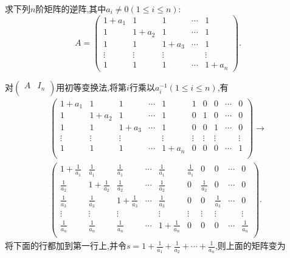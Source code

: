 \documentclass[../../main.tex]{subfiles}%
\begin{document}
\begin{example}\label{example2.3}
求下列\(n\)阶矩阵的逆阵,其中\(a_i \neq 0(1\leqslant  i\leqslant  n)\):
\[
A = 
\begin{pmatrix}
1 + a_1 & 1 & 1 & \cdots & 1 \\
1 & 1 + a_2 & 1 & \cdots & 1 \\
1 & 1 & 1 + a_3 & \cdots & 1 \\
\vdots & \vdots & \vdots & & \vdots \\
1 & 1 & 1 & \cdots & 1 + a_n
\end{pmatrix}.
\]
\end{example}
\begin{solution}
对\(\left( \begin{matrix}
A&		I_n\\
\end{matrix} \right) \)用初等变换法,将第\(i\)行乘以\(a_i^{-1}(1\leqslant  i\leqslant  n)\),有
\begin{gather*}
\left( \begin{matrix}
1+a_1&		1&		1&		\cdots&		1&		1&		0&		0&		\cdots&		0\\
1&		1+a_2&		1&		\cdots&		1&		0&		1&		0&		\cdots&		0\\
1&		1&		1+a_3&		\cdots&		1&		0&		0&		1&		\cdots&		0\\
\vdots&		\vdots&		\vdots&		&		\vdots&		\vdots&		\vdots&		\vdots&		&		\vdots\\
1&		1&		1&		\cdots&		1+a_n&		0&		0&		0&		\cdots&		1\\
\end{matrix} \right) \rightarrow 
\\
\left( \begin{matrix}
1+\frac{1}{a_1}&		\frac{1}{a_1}&		\frac{1}{a_1}&		\cdots&		\frac{1}{a_1}&		\frac{1}{a_1}&		0&		0&		\cdots&		0\\
\frac{1}{a_2}&		1+\frac{1}{a_2}&		\frac{1}{a_2}&		\cdots&		\frac{1}{a_2}&		0&		\frac{1}{a_2}&		0&		\cdots&		0\\
\frac{1}{a_3}&		\frac{1}{a_3}&		1+\frac{1}{a_3}&		\cdots&		\frac{1}{a_3}&		0&		0&		\frac{1}{a_3}&		\cdots&		0\\
\vdots&		\vdots&		\vdots&		&		\vdots&		\vdots&		\vdots&		\vdots&		&		\vdots\\
\frac{1}{a_n}&		\frac{1}{a_n}&		\frac{1}{a_n}&		\cdots&		1+\frac{1}{a_n}&		0&		0&		0&		\cdots&		\frac{1}{a_n}\\
\end{matrix} \right) .
\end{gather*}
将下面的行都加到第一行上,并令\(s = 1 + \frac{1}{a_1} + \frac{1}{a_2} + \cdots + \frac{1}{a_n}\),则上面的矩阵变为

\end{solution}
\end{document}
